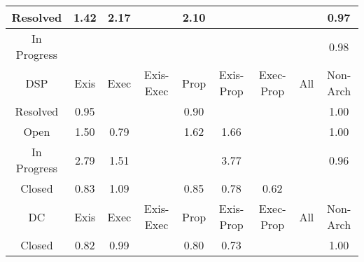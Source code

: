 \begin{tabular}{|c||c|c|c|c|c|c|c|c|}
\hline
Resolved & \cellcolor[rgb]{0.9079040882078909,0.839007199677422,0.42} 1.42 & \cellcolor[rgb]{0.9041384631984561,0.8372234825676897,0.42} 2.17 &  & \cellcolor[rgb]{0.9044704896838224,0.8373807582712842,0.42} 2.10 &  &  &  & \cellcolor[rgb]{0.9048256058665536,0.8155078677683535,0.41517056547544995} 0.97 \\ 
\hline
In Progress &  &  &  &  &  &  &  & \cellcolor[rgb]{0.9064373461614745,0.8231367718309794,0.4166748564173762} 0.98 \\ 
\hline
\hline
DSP & Exis & Exec & Exis-Exec & Prop & Exis-Prop & Exec-Prop & All & Non-Arch \\ 
\hline
Resolved & \cellcolor[rgb]{0.899752976240587,0.7914974208721116,0.41043611115788114} 0.95 &  &  & \cellcolor[rgb]{0.889705175887899,0.7439378325360553,0.40105816416203904} 0.90 &  &  &  & \cellcolor[rgb]{0.9099920770104569,0.8399962470049532,0.42} 1.00 \\ 
\hline
Open & \cellcolor[rgb]{0.9074885564624846,0.8388103688506505,0.42} 1.50 & \cellcolor[rgb]{0.8697727431492357,0.6495909842397152,0.3824545602726199} 0.79 &  & \cellcolor[rgb]{0.90687692343972,0.8385206479451305,0.42} 1.62 & \cellcolor[rgb]{0.9066771537527717,0.8384260201986813,0.42} 1.66 &  &  & \cellcolor[rgb]{0.909312192373784,0.8367443772359109,0.41935804621553174} 1.00 \\ 
\hline
In Progress & \cellcolor[rgb]{0.9010271656730058,0.8357497100556343,0.42} 2.79 & \cellcolor[rgb]{0.9074358830624816,0.8387854182927543,0.42} 1.51 &  &  & \cellcolor[rgb]{0.8960848010964161,0.8334085899930391,0.42} 3.77 &  &  & \cellcolor[rgb]{0.9019910266390057,0.8020908594246263,0.41252495819640517} 0.96 \\ 
\hline
Closed & \cellcolor[rgb]{0.8764018961639723,0.6809689751761354,0.38864176975304077} 0.83 & \cellcolor[rgb]{0.9095614646066307,0.839792272708404,0.42} 1.09 &  & \cellcolor[rgb]{0.880400864265248,0.6998974241888402,0.3923741399808981} 0.85 & \cellcolor[rgb]{0.8675580404758743,0.6391080582524712,0.38038750444414926} 0.78 & \cellcolor[rgb]{0.8360343193673709,0.48989577833888864,0.3509653647428795} 0.62 &  &  \\ 
\hline
\hline
DC & Exis & Exec & Exis-Exec & Prop & Exis-Prop & Exec-Prop & All & Non-Arch \\ 
\hline
Closed & \cellcolor[rgb]{0.8756479391919405,0.6774002455085184,0.3879380765791445} 0.82 & \cellcolor[rgb]{0.9082755162704269,0.8318374436800207,0.41839048185239847} 0.99 &  & \cellcolor[rgb]{0.8720365168806232,0.6603061799016164,0.3845674157552483} 0.80 & \cellcolor[rgb]{0.8567823738282886,0.5881032361205658,0.37033021557306933} 0.73 &  &  & \cellcolor[rgb]{0.9099885434034957,0.8399945731911295,0.42} 1.00 \\ 

\end{tabular}
